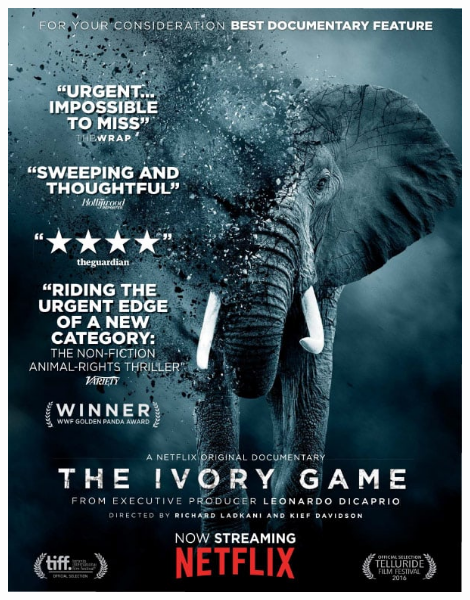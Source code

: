 \documentclass[10pt]{beamer}
\begin{document}
\begin{frame}[t]
\begin{columns}
		 \begin{column}{0.33\textwidth}
			\begin{center}
				\includegraphics[width=0.9\textwidth]{figures/ivory_game.jpg}
			\end{center}
		\end{column}
	\end{columns}
\end{frame}            
\end{document}
